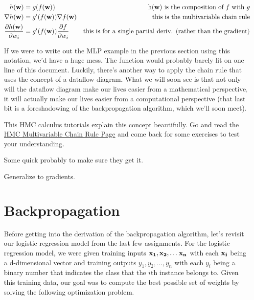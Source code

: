 \documentclass[assignment06_Solutions]{subfiles}
\begin{document}
\begin{align}
h(\mathbf{w}) &= g(f(\mathbf{w}))&\mbox{h($\mathbf{w}$) is the composition of $f$ with $g$} \nonumber \\
\nabla h(\mathbf{w}) &= g'(f(\mathbf{w})) \nabla f(\mathbf{w}) & \mbox{this is the multivariable chain rule} \\
\frac{\partial h(\mathbf{w})}{\partial w_i} &= g'(f(\mathbf{w})) \frac{\partial f}{\partial w_i}& \mbox{this is for a single partial deriv. (rather than the gradient)}
\end{align}

If we were to write out the MLP example in the previous section using this notation, we'd have a huge mess.  The function would probably barely fit on one line of this document.  Luckily, there's another way to apply the chain rule that uses the concept of a dataflow diagram.  What we will soon see is that not only will the dataflow diagram make our lives easier from a mathematical perspective, it will actually make our lives easier from a computational perspective (that last bit is a foreshadowing of the backpropagation algorithm, which we'll soon meet).


\begin{externalresources}[(20 minutes)]
This HMC calculus tutorials explain this concept beautifully.  Go and read the \href{https://www.math.hmc.edu/calculus/tutorials/multichainrule/}{HMC Multivariable Chain Rule Page} and come back for some exercises to test your understanding.
\end{externalresources}

\begin{exercise}
\bes
\item Some quick probably to make sure they get it.
\item Generalize to gradients.
\ees
\end{exercise}


\section{Backpropagation}

Before getting into the derivation of the backpropagation algorithm, let's revisit our logistic regression model from the last few assignments.  For the logistic regression model, we were given training inputs $\mathbf{x_1}, \mathbf{x_2}, \ldots \mathbf{x_n}$ with each $\mathbf{x_i}$ being a d-dimensional vector and training outputs $y_1, y_2, \ldots, y_n$ with each $y_i$ being a binary number that indicates the class that the $i$th instance belongs to.  Given this training data, our goal was to compute the best possible set of weights by solving the following optimization problem.
\end{document}
